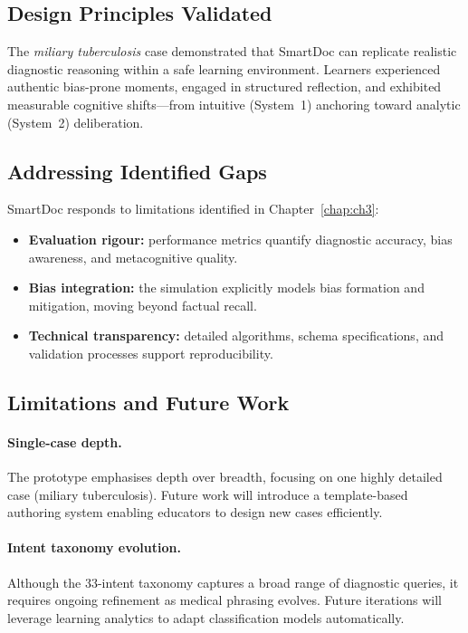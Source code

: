 \subsection{Design Principles Validated}

The \textit{miliary tuberculosis} case demonstrated that SmartDoc can replicate
realistic diagnostic reasoning within a safe learning environment. Learners
experienced authentic bias-prone moments, engaged in structured reflection, and
exhibited measurable cognitive shifts—from intuitive (System~1) anchoring toward
analytic (System~2) deliberation.

\subsection{Addressing Identified Gaps}

SmartDoc responds to limitations identified in Chapter~\ref{chap:ch3}:

\begin{itemize}
  \item \textbf{Evaluation rigour:} performance metrics quantify diagnostic
  accuracy, bias awareness, and metacognitive quality.
  \item \textbf{Bias integration:} the simulation explicitly models bias
  formation and mitigation, moving beyond factual recall.
  \item \textbf{Technical transparency:} detailed algorithms, schema
  specifications, and validation processes support reproducibility.
\end{itemize}

\subsection{Limitations and Future Work}

\paragraph{Single-case depth.}
The prototype emphasises depth over breadth, focusing on one highly detailed
case (miliary tuberculosis). Future work will introduce a template-based
authoring system enabling educators to design new cases efficiently.

\paragraph{Intent taxonomy evolution.}
Although the 33-intent taxonomy captures a broad range of diagnostic queries, it
requires ongoing refinement as medical phrasing evolves. Future iterations will
leverage learning analytics to adapt classification models automatically.

